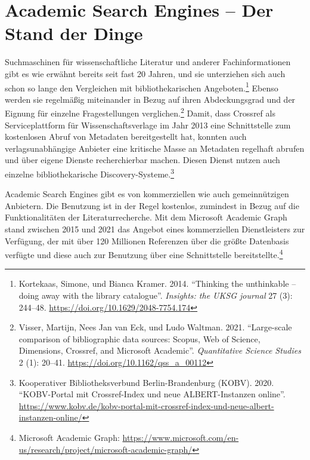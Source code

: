 \documentclass[a4paper,
fontsize=11pt,
oneside,
numbers=noperiodatend,
parskip=half-,
bibliography=totoc,
final
]{scrartcl}
\begin{document}
\section{Academic Search Engines -- Der Stand der Dinge}

Suchmaschinen für wissenschaftliche Literatur und anderer
Fachinformationen gibt es wie erwähnt bereits seit fast 20 Jahren, und
sie unterziehen sich auch schon so lange den Vergleichen mit
bibliothekarischen Angeboten.\footnote{Kortekaas, Simone, und Bianca
  Kramer. 2014. \enquote{Thinking the unthinkable -- doing away with the
  library catalogue}. \emph{Insights: the UKSG journal} 27 (3): 244--48.
  \url{https://doi.org/10.1629/2048-7754.174}} Ebenso werden sie
regelmäßig miteinander in Bezug auf ihren Abdeckungsgrad und der Eignung
für einzelne Fragestellungen verglichen.\footnote{Visser, Martijn, Nees
  Jan van Eck, und Ludo Waltman. 2021. \enquote{Large-scale comparison
  of bibliographic data sources: Scopus, Web of Science, Dimensions,
  Crossref, and Microsoft Academic}. \emph{Quantitative Science Studies}
  2 (1): 20--41. \url{https://doi.org/10.1162/qss_a_00112}} Damit, dass
Crossref als Serviceplattform für Wissenschaftsverlage im Jahr 2013 eine
Schnittstelle zum kostenlosen Abruf von Metadaten bereitgestellt hat,
konnten auch verlagsunabhängige Anbieter eine kritische Masse an
Metadaten regelhaft abrufen und über eigene Dienste recherchierbar
machen. Diesen Dienst nutzen auch einzelne bibliothekarische
Discovery-Systeme.\footnote{Kooperativer Bibliotheksverbund
  Berlin-Brandenburg (KOBV). 2020. \enquote{KOBV-Portal mit
  Crossref-Index und neue ALBERT-Instanzen online}.
  \url{https://www.kobv.de/kobv-portal-mit-crossref-index-und-neue-albert-instanzen-online/}}

Academic Search Engines gibt es von kommerziellen wie auch
gemeinnützigen Anbietern. Die Benutzung ist in der Regel kostenlos,
zumindest in Bezug auf die Funktionalitäten der Literaturrecherche. Mit
dem Microsoft Academic Graph stand zwischen 2015 und 2021 das Angebot
eines kommerziellen Dienstleisters zur Verfügung, der mit über 120
Millionen Referenzen über die größte Datenbasis verfügte und diese auch
zur Benutzung über eine Schnittstelle bereitstellte.\footnote{Microsoft
  Academic Graph:
  \url{https://www.microsoft.com/en-us/research/project/microsoft-academic-graph/}}
\end{document}

